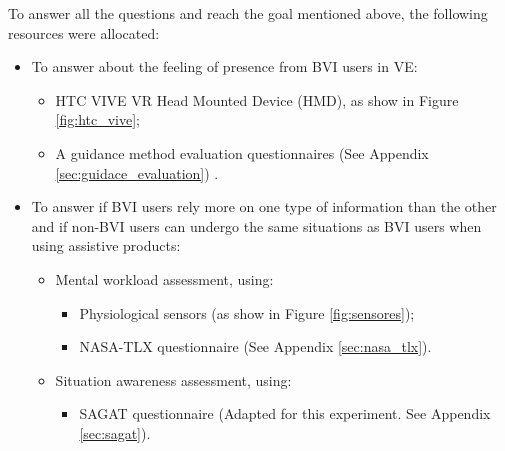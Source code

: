 To answer all the questions and reach the goal mentioned above, the following resources were allocated:

\begin{itemize}
    \item To answer about the feeling of presence from BVI users in VE:
    \begin{itemize}
        \item HTC VIVE VR Head Mounted Device (HMD), as show in Figure \ref{fig:htc_vive};
        \item A guidance method evaluation questionnaires (See Appendix  \ref{sec:guidace_evaluation}) .
    \end{itemize}
    \item To answer if BVI users rely more on one type of information than the other and if non-BVI users can undergo the same situations as BVI users when using assistive products:
    \begin{itemize}
        \item Mental workload assessment, using:
            \begin{itemize}
                \item Physiological sensors (as show in Figure \ref{fig:sensores});
                \item NASA-TLX questionnaire (See Appendix  \ref{sec:nasa_tlx}).
            \end{itemize}
            \item Situation awareness assessment, using:
            \begin{itemize}
                \item SAGAT questionnaire (Adapted for this experiment. See Appendix \ref{sec:sagat}).
            \end{itemize}
    \end{itemize}
\end{itemize}

